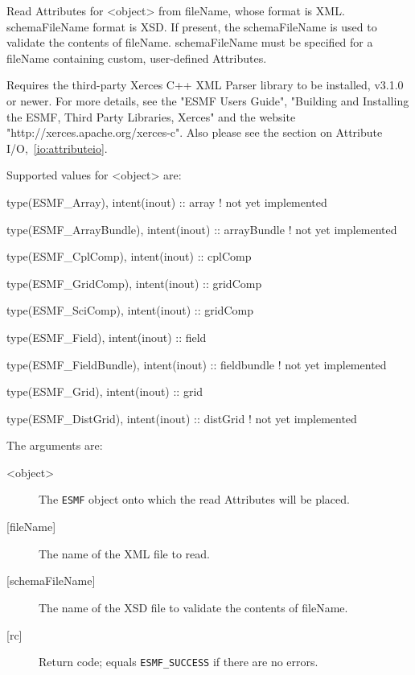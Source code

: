    Read Attributes for <object> from fileName, whose format is XML.
   schemaFileName format is XSD. If present, the schemaFileName is used to
   validate the contents of fileName. schemaFileName must be specified for
   a fileName containing custom, user-defined Attributes.
  
   Requires the third-party Xerces C++ XML Parser library to be installed,
   v3.1.0 or newer. For more details, see the "ESMF Users Guide",
   "Building and Installing the ESMF, Third Party Libraries, Xerces" and
   the website
   \newline
   "http://xerces.apache.org/xerces-c". Also please see the
   section on Attribute I/O,~\ref{io:attributeio}.
  
   Supported values for <object> are:
   \begin{description}
   \item type(ESMF\_Array), intent(inout) :: array ! not yet implemented
   \item type(ESMF\_ArrayBundle), intent(inout) :: arrayBundle ! not yet implemented
   \item type(ESMF\_CplComp), intent(inout) :: cplComp
   \item type(ESMF\_GridComp), intent(inout) :: gridComp
   \item type(ESMF\_SciComp), intent(inout) :: gridComp
   \item type(ESMF\_Field), intent(inout) :: field
   \item type(ESMF\_FieldBundle), intent(inout) :: fieldbundle ! not yet implemented
   \item type(ESMF\_Grid), intent(inout) :: grid
   \item type(ESMF\_DistGrid), intent(inout) :: distGrid ! not yet implemented
   \end{description}
  
   The arguments are:
   \begin{description}
   \item [<object>]
   The {\tt ESMF} object onto which the read Attributes will be placed.
   \item [{[fileName]}]
   The name of the XML file to read.
   \item [{[schemaFileName]}]
   The name of the XSD file to validate the contents of fileName.
   \item [{[rc]}]
   Return code; equals {\tt ESMF\_SUCCESS} if there are no errors.
   \end{description}
   
 
